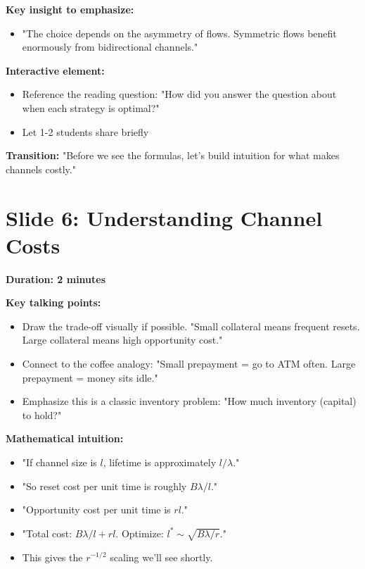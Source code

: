 \documentclass[11pt]{article}
\begin{document}
\textbf{Key insight to emphasize:}
\begin{itemize}
    \item "The choice depends on the asymmetry of flows. Symmetric flows benefit enormously from bidirectional channels."
\end{itemize}

\textbf{Interactive element:}
\begin{itemize}
    \item Reference the reading question: "How did you answer the question about when each strategy is optimal?"
    \item Let 1-2 students share briefly
\end{itemize}

\textbf{Transition:} "Before we see the formulas, let's build intuition for what makes channels costly."

\section*{Slide 6: Understanding Channel Costs}

\textbf{Duration: 2 minutes}

\textbf{Key talking points:}
\begin{itemize}
    \item Draw the trade-off visually if possible. "Small collateral means frequent resets. Large collateral means high opportunity cost."
    \item Connect to the coffee analogy: "Small prepayment = go to ATM often. Large prepayment = money sits idle."
    \item Emphasize this is a classic inventory problem: "How much inventory (capital) to hold?"
\end{itemize}

\textbf{Mathematical intuition:}
\begin{itemize}
    \item "If channel size is $l$, lifetime is approximately $l/\lambda$."
    \item "So reset cost per unit time is roughly $B\lambda/l$."
    \item "Opportunity cost per unit time is $rl$."
    \item "Total cost: $B\lambda/l + rl$. Optimize: $l^* \sim \sqrt{B\lambda/r}$."
    \item This gives the $r^{-1/2}$ scaling we'll see shortly.
\end{itemize}
\end{document}
